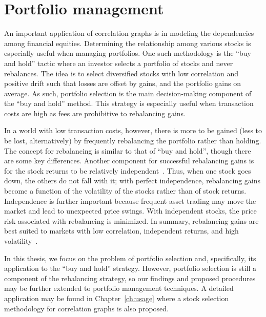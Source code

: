 \section{Portfolio management}
\label{sec:intro:finance}

An important application of correlation graphs is in modeling the dependencies 
among financial equities. Determining the relationship among various stocks is 
especially useful when managing portfolios. One such methodology is the ``buy 
and hold'' tactic where an investor selects a portfolio of stocks and never 
rebalances. The idea is to select diversified stocks with low correlation and 
positive drift such that losses are offset by gains, and the portfolio gains on 
average. As such, portfolio selection is the main decision-making component of 
the ``buy and hold'' method. This strategy is especially useful when 
transaction costs are high as fees are prohibitive to rebalancing gains. 

In a world with low transaction costs, however, there is more to be gained 
(less to be lost, alternatively) by frequently rebalancing the portfolio rather 
than holding. The concept for rebalancing is similar to that of ``buy and 
hold'', though there are some key differences. Another component for successful 
rebalancing gains is for the stock returns to be relatively 
independent~\cite{liuh2016}. Thus, when one stock goes down, the others do not 
fall with it; with perfect independence, rebalancing gains become a function of 
the volatility of the stocks rather than of stock returns. Independence is 
further important because frequent asset trading may move the market and lead 
to unexpected price swings. With independent stocks, the price risk associated 
with rebalancing is minimized. In summary, rebalancing gains are best suited to 
markets with low correlation, independent returns, and high 
volatility~\cite{liuh2016}. 

In this thesis, we focus on the problem of portfolio selection and, 
specifically, its application to the ``buy and hold'' strategy. However, 
portfolio selection is still a component of the rebalancing strategy, so our 
findings and proposed procedures may be further extended to portfolio 
management techniques.
A detailed application may be found in Chapter~\ref{ch:usage} where
a stock selection methodology for correlation graphs is also proposed.

